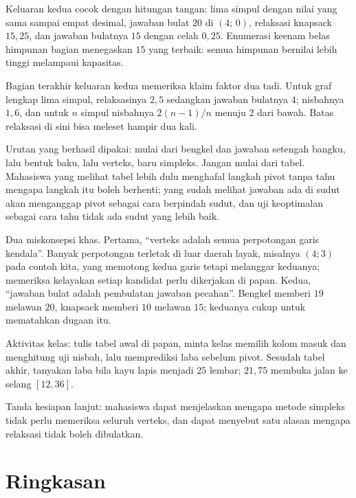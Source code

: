 Keluaran kedua cocok dengan hitungan tangan: lima simpul dengan nilai yang sama
sampai empat desimal, jawaban bulat $20$ di $(4;\,0)$, relaksasi knapsack $15{,}25$, dan
jawaban bulatnya $15$ dengan celah $0{,}25$. Enumerasi keenam belas himpunan bagian
menegaskan $15$ yang terbaik: semua himpunan bernilai lebih tinggi melampaui kapasitas.

Bagian terakhir keluaran kedua memeriksa klaim faktor dua tadi. Untuk graf
lengkap lima simpul, relaksasinya $2{,}5$ sedangkan jawaban bulatnya $4$; nisbahnya $1{,}6$,
dan untuk $n$ simpul nisbahnya $2(n-1)/n$ menuju $2$ dari bawah. Batas relaksasi di sini bisa
meleset hampir dua kali.

\begin{untukdosen}
Urutan yang berhasil dipakai: mulai dari bengkel dan jawaban setengah bangku, lalu bentuk
baku, lalu verteks, baru simpleks. Jangan mulai dari tabel. Mahasiswa yang melihat tabel
lebih dulu menghafal langkah pivot tanpa tahu mengapa langkah itu boleh berhenti; yang sudah
melihat jawaban ada di sudut akan menganggap pivot sebagai cara berpindah sudut, dan uji
keoptimalan sebagai cara tahu tidak ada sudut yang lebih baik.

Dua miskonsepsi khas. Pertama, ``verteks adalah semua perpotongan garis
kendala''. Banyak perpotongan terletak di luar daerah layak, misalnya $(4;3)$ pada contoh
kita, yang memotong kedua garis tetapi melanggar keduanya; memeriksa kelayakan setiap kandidat
perlu dikerjakan di papan. Kedua, ``jawaban bulat adalah pembulatan jawaban pecahan''. Bengkel
memberi $19$ melawan $20$, knapsack memberi $10$ melawan $15$; keduanya cukup untuk
mematahkan dugaan itu.

Aktivitas kelas: tulis tabel awal di papan, minta kelas memilih kolom masuk dan menghitung
uji nisbah, lalu memprediksi laba sebelum pivot. Sesudah tabel akhir, tanyakan laba bila
kayu lapis menjadi $25$ lembar; $21{,}75$ membuka jalan ke selang $[12,36]$.

Tanda kesiapan lanjut: mahasiswa dapat menjelaskan mengapa metode simpleks tidak perlu
memeriksa seluruh verteks, dan dapat menyebut satu alasan mengapa relaksasi tidak boleh
dibulatkan.
\end{untukdosen}

\section{Ringkasan}

